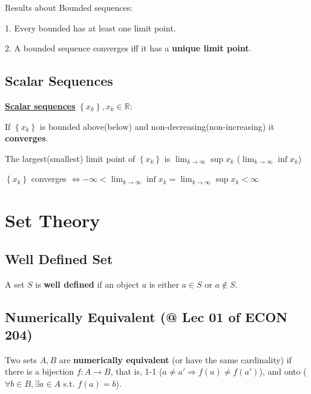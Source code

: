 \documentclass[11pt]{elegantbook}
\begin{document}
Results about Bounded sequences:

1. Every bounded has at least one limit point.

2. A bounded sequence converges iff it has a \textbf{unique limit point}.

\subsection{Scalar Sequences}
\textbf{\underline{Scalar sequences}} $\left\{x_{k}\right\}, x_{k} \in \mathbb{R}$:
\begin{proposition}
    If $\left\{x_{k}\right\}$ is bounded above(below) and non-decreasing(non-increasing) it \textbf{converges}.
\end{proposition}

\begin{proposition}
    The largest(smallest) limit point of $\left\{x_{k}\right\}$ is $\lim _{k \rightarrow \infty}\sup x_{k}$ ($\lim _{k \rightarrow \infty}\inf x_{k}$)
\end{proposition}

\begin{proposition}
    $\left\{x_{k}\right\}$ converges $\Longleftrightarrow-\infty<\lim _{k \rightarrow \infty} \inf x_{k}=\lim _{k \rightarrow \infty}\sup x_{k}<\infty$
\end{proposition}

\section{Set Theory}
\subsection{Well Defined Set}
\begin{definition}
    A set $S$ is \textbf{well defined} if an object $a$ is either $a\in S$ or $a\notin S$.
\end{definition}

\subsection{Numerically Equivalent \small{(@ Lec 01 of ECON 204)}}
\begin{definition}
\normalfont
    Two sets $A, B$ are \textbf{numerically equivalent} (or have the same cardinality) if there is a bijection $f : A \rightarrow B$, that is, 1-1 ($a \neq a' \Rightarrow f(a) \neq f(a')$), and onto ($\forall b\in B, \exists a\in A$ s.t. $f(a)=b$).
\end{definition}
\end{document}
